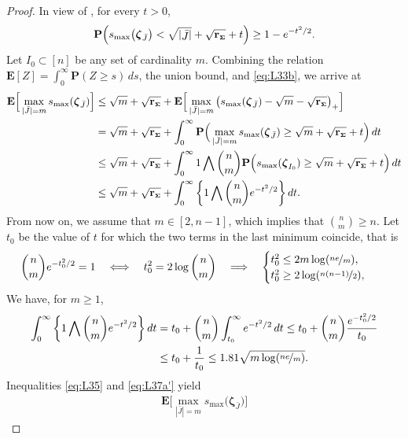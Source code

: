 \documentclass[aos,preprint,reqno]{imsart}
\newcommand\bzeta{\boldsymbol\zeta}
\newcommand\bSigma{\boldsymbol\Sigma}
\newcommand\bfE{\mathbf E}
\newcommand\bfP{\mathbf P}
\newcommand\rSigma{\textbf{\textup{r}}_{\scriptscriptstyle\bSigma}}
\theoremstyle{plain}
\theoremstyle{remark}
\begin{document}
\begin{proof}
	In view of , for every $t>0$,
	\begin{align}
		\bfP\Big(s_{\max}\big(\bzeta_{\bar J}\big) 	
		< \sqrt{|\vbox to 7pt{\hbox{$\bar J$}}|} + \sqrt{\rSigma}+ t\Big)
		\ge 1-e^{-t^2/2}.\label{eq:L33b}
	\end{align}
	Let $I_0\subset [n]$ be any set of cardinality $m$. Combining 
	the relation $\bfE[Z] = \int_0^\infty \bfP(Z\ge s)\,ds$, the union bound, 
	and \eqref{eq:L33b}, we arrive at
	\begin{align}
	\bfE\Big[\max_{|\bar J| = m} s_{\max}(\bzeta_{\bar J})\Big]
			&\le \sqrt{m}+\sqrt{\rSigma}+ \bfE\Big[\max_{|\bar J| = m} 
			\big(s_{\max}(\bzeta_{\bar J}) - \sqrt{m} - \sqrt{\rSigma}\big)_+\Big]\\
			& = \sqrt{m} + \sqrt{\rSigma}+ \int_0^\infty \bfP\Big(\max_{|\bar J| = m} 
			s_{\max}(\bzeta_{\bar J})\ge \sqrt{m} +\sqrt{\rSigma} + t \Big)\,dt\\
			&\le \sqrt{m}+\sqrt{\rSigma}+ \int_0^\infty 1\bigwedge {n\choose{m}}
			\bfP\Big(s_{\max}(\bzeta_{I_0}) \ge \sqrt{m} +\sqrt{\rSigma} + t \Big)\,dt\\		
			&\le \sqrt{m} + \sqrt{\rSigma} +  
			\int_{0}^\infty \bigg\{1\bigwedge {n \choose {m}}e^{-t^2/2} 
			\bigg\}\,dt.\label{eq:L35}
	\end{align}	
	From now on, we assume that $m\in [2,n-1]$, which implies that $ {n \choose {m}} \ge n$.
	Let $t_0$ be the value of $t$ for which the two terms in the last minimum
	coincide, that is
	\begin{align}
			{n \choose{m}}e^{-t_0^2/2} = 1
			\quad&\Longleftrightarrow\quad
			t_0^2 =  2\log{n \choose{m}}
			\quad\Longrightarrow\quad
			\begin{cases}
			t_0^2 	\le 2m \log(\nicefrac{ne}{m}),\\
			t_0^2 	\ge 2 \log(\nicefrac{n(n-1)}{2}),
			\end{cases}
			\label{eq:L36}
	\end{align}
	We have, for $m\ge 1$,
	\begin{align}
			\int_{0}^\infty \bigg\{1\bigwedge {n \choose{m}}e^{-t^2/2} \bigg\}\,dt
			& = t_0 + {n \choose{m}}\int_{t_0}^\infty e^{-t^2/2}\,dt
			 \le {t_0} +  {n \choose{m}} \frac{e^{-t^2_0/2}}{t_0}\\
			& \le {t_0} +  \frac{1}{t_0}
			\le 1.81\sqrt{m \log(\nicefrac{ne}{m})}.\label{eq:L37a'}
	\end{align}
	Inequalities \eqref{eq:L35} and \eqref{eq:L37a'} yield
	\begin{align}
		\bfE\Big[\max_{|\bar J| = m}s_{\max}\big(\bzeta_{\bar J}\big)\Big]

\end{align}
\end{proof}
\end{document}
